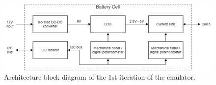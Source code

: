\begin{figure}[h]
    \centering
    \includegraphics[scale=0.5]{architecture_1st_iteration.png}
    \caption{Architecture block diagram of the 1st iteration of the emulator.}
\end{figure}
